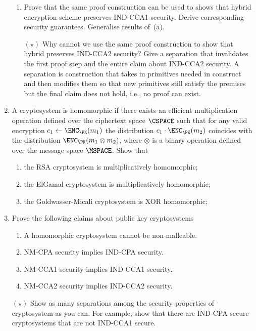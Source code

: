 \documentclass{article}
\begin{document}
\begin{enumerate}
\begin{enumerate}
  \item Prove that the same proof construction can be used to shows
    that hybrid encryption scheme preserves IND-CCA1 security.  Derive
    corresponding security guarantees. Generalise results of~(a).

  \item[$(\star)$] Why cannot we use the same proof construction to
    show that hybrid preserves IND-CCA2 security? Give a separation
    that invalidates the first proof step and the entire claim about
    IND-CCA2 security. A separation is construction that takes in
    primitives needed in construct and then modifies them so that new
    primitives still satisfy the premises but the final claim does not
    hold, i.e., no proof can exist.
  \end{enumerate}

\item A cryptosystem is homomorphic if there exists an efficient
  multiplication operation defined over the ciphertext space $\CSPACE$
  such that for any valid encryption $c_1\gets\ENC_\PK(m_1)$ the
  distribution $c_1\cdot \ENC_\PK(m_2)$ coincides with the
  distribution $\ENC_\PK(m_1\otimes m_2)$, where $\otimes$ is a binary
  operation defined over the message space $\MSPACE$. Show that
  \begin{enumerate}
  \item the RSA cryptosystem is multiplicatively homomorphic;
  \item the ElGamal cryptosystem is multiplicatively homomorphic;
  \item the Goldwasser-Micali cryptosystem is XOR homomorphic; 
  \end{enumerate}

\item Prove the following claims about public key cryptosystems
  \begin{enumerate}
  \item A homomorphic cryptosystem cannot be non-malleable.
  \item NM-CPA security implies IND-CPA security.
  \item NM-CCA1 security implies IND-CCA1 security.
  \item NM-CCA2 security implies IND-CCA2 security.
  \end{enumerate}

\item[$(\star)$] Show as many separations among the security
  properties of cryptosystem as you can. For example, show that there
  are IND-CPA secure cryptosystems that are not IND-CCA1 secure.

\end{enumerate}
\end{document}

